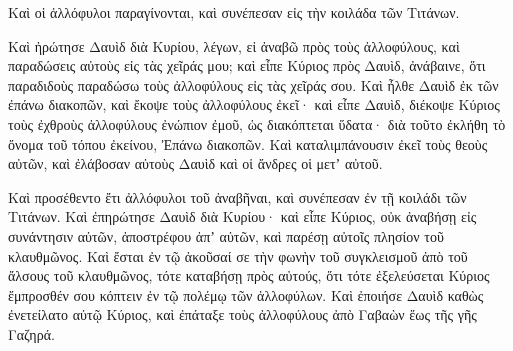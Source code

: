 {Καὶ οἱ ἀλλόφυλοι παραγίνονται, καὶ συνέπεσαν εἰς τὴν κοιλάδα τῶν Τιτάνων.
\par }{\PP {}Καὶ ἠρώτησε Δαυὶδ διὰ Κυρίου, λέγων, εἰ ἀναβῶ πρὸς τοὺς ἀλλοφύλους, καὶ παραδώσεις αὐτοὺς εἰς τὰς χεῖράς μου; καὶ εἶπε Κύριος πρὸς Δαυὶδ, ἀνάβαινε, ὅτι παραδιδοὺς παραδώσω τοὺς ἀλλοφύλους εἰς τὰς χεῖράς σου.
Καὶ ἦλθε Δαυὶδ ἐκ τῶν ἐπάνω διακοπῶν, καὶ ἔκοψε τοὺς ἀλλοφύλους ἐκεῖ· καὶ εἶπε Δαυὶδ, διέκοψε Κύριος τοὺς ἐχθροὺς ἀλλοφύλους ἐνώπιον ἐμοῦ, ὡς διακόπτεται ὕδατα· διὰ τοῦτο ἐκλήθη τὸ ὄνομα τοῦ τόπου ἐκείνου, Ἐπάνω διακοπῶν.
Καὶ καταλιμπάνουσιν ἐκεῖ τοὺς θεοὺς αὐτῶν, καὶ ἐλάβοσαν αὐτοὺς Δαυὶδ καὶ οἱ ἄνδρες οἱ μετʼ αὐτοῦ.
\par }{\PP {}Καὶ προσέθεντο ἔτι ἀλλόφυλοι τοῦ ἀναβῆναι, καὶ συνέπεσαν ἐν τῇ κοιλάδι τῶν Τιτάνων.
Καὶ ἐπηρώτησε Δαυὶδ διὰ Κυρίου· καὶ εἶπε Κύριος, οὐκ ἀναβήσῃ εἰς συνάντησιν αὐτῶν, ἀποστρέφου ἀπʼ αὐτῶν, καὶ παρέσῃ αὐτοῖς πλησίον τοῦ κλαυθμῶνος.
Καὶ ἔσται ἐν τῷ ἀκοῦσαί σε τὴν φωνὴν τοῦ συγκλεισμοῦ ἀπὸ τοῦ ἄλσους τοῦ κλαυθμῶνος, τότε καταβήσῃ πρὸς αὐτούς, ὅτι τότε ἐξελεύσεται Κύριος ἔμπροσθέν σου κόπτειν ἐν τῷ πολέμῳ τῶν ἀλλοφύλων.
Καὶ ἐποιήσε Δαυὶδ καθὼς ἐνετείλατο αὐτῷ Κύριος, καὶ ἐπάταξε τοὺς ἀλλοφύλους ἀπὸ Γαβαὼν ἕως τῆς γῆς Γαζηρά.

}
